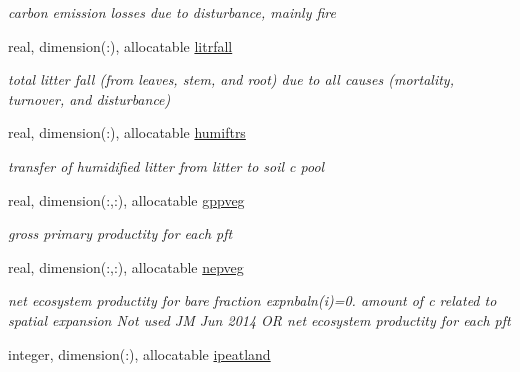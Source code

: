 \begin{DoxyCompactItemize}
\begin{DoxyCompactList}\small\item\em carbon emission losses due to disturbance, mainly fire \end{DoxyCompactList}\item 
\hypertarget{structctem__statevars_1_1veg__gat_a8b34b4d469e6592357a525089104f398}{}real, dimension(\+:), allocatable \hyperlink{structctem__statevars_1_1veg__gat_a8b34b4d469e6592357a525089104f398}{litrfall}\label{structctem__statevars_1_1veg__gat_a8b34b4d469e6592357a525089104f398}

\begin{DoxyCompactList}\small\item\em total litter fall (from leaves, stem, and root) due to all causes (mortality, turnover, and disturbance) \end{DoxyCompactList}\item 
\hypertarget{structctem__statevars_1_1veg__gat_af75055fc0dbe5b6ea3395b663f17ec9b}{}real, dimension(\+:), allocatable \hyperlink{structctem__statevars_1_1veg__gat_af75055fc0dbe5b6ea3395b663f17ec9b}{humiftrs}\label{structctem__statevars_1_1veg__gat_af75055fc0dbe5b6ea3395b663f17ec9b}

\begin{DoxyCompactList}\small\item\em transfer of humidified litter from litter to soil c pool \end{DoxyCompactList}\item 
\hypertarget{structctem__statevars_1_1veg__gat_a04ee0ffdae22e33d02dfc6bb9c9f99cf}{}real, dimension(\+:,\+:), allocatable \hyperlink{structctem__statevars_1_1veg__gat_a04ee0ffdae22e33d02dfc6bb9c9f99cf}{gppveg}\label{structctem__statevars_1_1veg__gat_a04ee0ffdae22e33d02dfc6bb9c9f99cf}

\begin{DoxyCompactList}\small\item\em gross primary productity for each pft \end{DoxyCompactList}\item 
\hypertarget{structctem__statevars_1_1veg__gat_ae439221581c0d86ffc4f15f9040ee021}{}real, dimension(\+:,\+:), allocatable \hyperlink{structctem__statevars_1_1veg__gat_ae439221581c0d86ffc4f15f9040ee021}{nepveg}\label{structctem__statevars_1_1veg__gat_ae439221581c0d86ffc4f15f9040ee021}

\begin{DoxyCompactList}\small\item\em net ecosystem productity for bare fraction expnbaln(i)=0. amount of c related to spatial expansion Not used J\+M Jun 2014 O\+R net ecosystem productity for each pft \end{DoxyCompactList}\item 
\hypertarget{structctem__statevars_1_1veg__gat_a79caec6eedb8e3b4ebe64ccc10a271ec}{}integer, dimension(\+:), allocatable \hyperlink{structctem__statevars_1_1veg__gat_a79caec6eedb8e3b4ebe64ccc10a271ec}{ipeatland}\label{structctem__statevars_1_1veg__gat_a79caec6eedb8e3b4ebe64ccc10a271ec}


\end{DoxyCompactItemize}
